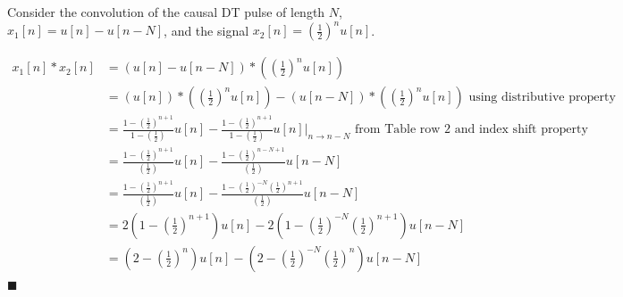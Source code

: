 \begin{example} Consider the convolution of the causal DT pulse of length $N$, $x_1[n] = u[n] - u[n-N]$, and the signal $x_2[n] = \left( \frac{1}{2}\right)^nu[n]$.

  \begin{align*}
    x_1[n] * x_2[n] &= \left( u[n] - u[n-N]\right) * \left( \left( \frac{1}{2}\right)^nu[n] \right)\\
    &= \left( u[n] \right) * \left( \left( \frac{1}{2}\right)^nu[n] \right) - \left( u[n-N]\right) * \left( \left( \frac{1}{2}\right)^nu[n] \right) \mbox{ using distributive property}\\
    &= \frac{1-\left(\frac{1}{2}\right)^{n+1}}{1-\left(\frac{1}{2}\right)}u[n] - \frac{1-\left(\frac{1}{2}\right)^{n+1}}{1-\left(\frac{1}{2}\right)}u[n] \Big|_{n\rightarrow n-N} \mbox{ from Table row 2 and index shift property}\\
    &= \frac{1-\left(\frac{1}{2}\right)^{n+1}}{\left(\frac{1}{2}\right)}u[n] - \frac{1-\left(\frac{1}{2}\right)^{n-N+1}}{\left(\frac{1}{2}\right)}u[n-N]\\
    &= \frac{1-\left(\frac{1}{2}\right)^{n+1}}{\left(\frac{1}{2}\right)}u[n] - \frac{1-\left(\frac{1}{2}\right)^{-N}\left(\frac{1}{2}\right)^{n+1}}{\left(\frac{1}{2}\right)}u[n-N]\\
    &= 2\left(1-\left(\frac{1}{2}\right)^{n+1}\right)u[n] - 2\left(1-\left(\frac{1}{2}\right)^{-N}\left(\frac{1}{2}\right)^{n+1} \right)u[n-N]\\
    &= \left(2-\left(\frac{1}{2}\right)^{n}\right)u[n] - \left(2-\left(\frac{1}{2}\right)^{-N}\left(\frac{1}{2}\right)^{n} \right)u[n-N]
  \end{align*}
$\blacksquare$
\end{example}

